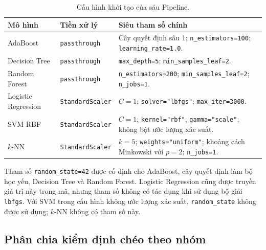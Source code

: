 \documentclass[12pt,a4paper,oneside]{report}
\begin{document}
\begin{table}[H]
    \centering
    \small
    \caption{Cấu hình khởi tạo của sáu Pipeline.}
    \label{tab:pipeline_configs}
    \begin{tabularx}{\textwidth}{
        >{\raggedright\arraybackslash}p{2.7cm}
        >{\raggedright\arraybackslash}p{3.0cm}
        >{\raggedright\arraybackslash}X}
        \toprule
        \textbf{Mô hình}
        & \textbf{Tiền xử lý}
        & \textbf{Siêu tham số chính} \\
        \midrule
        AdaBoost
        & \texttt{passthrough}
        & Cây quyết định sâu 1;
          \texttt{n\_estimators=100};
          \texttt{learning\_rate=1.0}. \\

        Decision Tree
        & \texttt{passthrough}
        & \texttt{max\_depth=5};
          \texttt{min\_samples\_leaf=2}. \\

        Random Forest
        & \texttt{passthrough}
        & \texttt{n\_estimators=200};
          \texttt{min\_samples\_leaf=2};
          \texttt{n\_jobs=1}. \\

        Logistic Regression
        & \texttt{StandardScaler}
        & $C=1$;
          \texttt{solver="lbfgs"};
          \texttt{max\_iter=3000}. \\

        SVM RBF
        & \texttt{StandardScaler}
        & $C=1$;
          \texttt{kernel="rbf"};
          \texttt{gamma="scale"};
          không bật ước lượng xác suất. \\

        $k$-NN
        & \texttt{StandardScaler}
        & $k=5$;
          \texttt{weights="uniform"};
          khoảng cách Minkowski với $p=2$;
          \texttt{n\_jobs=1}. \\
        \bottomrule
    \end{tabularx}
\end{table}

Tham số \texttt{random\_state=42} được cố định cho AdaBoost,
cây quyết định làm bộ học yếu, Decision Tree và Random Forest.
Logistic Regression cũng được truyền giá trị này trong mã,
nhưng tham số không có tác dụng khi sử dụng bộ giải
\texttt{lbfgs}. Với SVM trong cấu hình không ước lượng
xác suất, \texttt{random\_state} không được sử dụng;
$k$-NN không có tham số này.

\subsection{Phân chia kiểm định chéo theo nhóm}
\end{document}
